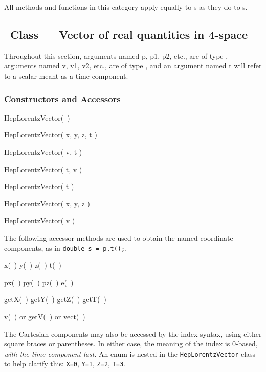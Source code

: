 All methods and functions in this category apply equally to
\UV s as they do to \SV s.



\subsection{\protect\LV\ Class --- Vector of real quantities in 4-space}

Throughout this section,
arguments named p, p1, p2, etc., are of type \LV ,
arguments named v, v1, v2, etc., are of type \SV ,
and an argument named t will refer to a scalar meant as a time component.

\subsubsection{Constructors and Accessors}

\begin{shortlist}
  \item HepLorentzVector(~)
  \item HepLorentzVector( x, y, z, t )
  \item HepLorentzVector( v, t )
  \item HepLorentzVector( t, v )
  \item HepLorentzVector( t )
  \item HepLorentzVector( x, y, z )
  \item HepLorentzVector( v )
\end{shortlist}

\noindent
The following accessor methods are used
to obtain the named coordinate components,
as in \verb|double s = p.t();|.
\begin{shortlist}
  \item x(~) \/\/\/ y(~) \/\/\/ z(~) \/\/\/ t(~)
  \item px(~) \/\/\/ py(~) \/\/\/ pz(~) \/\/\/ e(~)
  \item getX(~) \/\/\/ getY(~) \/\/\/ getZ(~) \/\/\/ getT(~)
  \item v(~) or getV(~) or vect(~)
\end{shortlist}


\noindent
The Cartesian components may also be accessed by the index syntax, 
using either square braces or parentheses.  
In either case, the meaning of the index is 0-based, {\em with the
time component last}.
An enum is nested in the {\tt HepLorentzVector} class to help clarify this: 
{\tt X=0}, {\tt Y=1}, {\tt Z=2}, {\tt T=3}.

